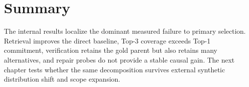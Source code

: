 \section{Summary}

The internal results localize the dominant measured failure to primary selection. Retrieval improves the direct baseline, Top-3 coverage exceeds Top-1 commitment, verification retains the gold parent but also retains many alternatives, and repair probes do not provide a stable causal gain. The next chapter tests whether the same decomposition survives external synthetic distribution shift and scope expansion.
